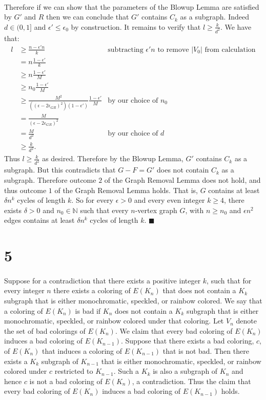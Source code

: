 \documentclass[letterpaper,12pt,oneside,onecolumn]{article}
\newcommand{\N}{\mathbb{N}} \newcommand{\R}{\mathbb{R}}
\begin{document}
\paragraph{}
Therefore if we can show that the parameters of the Blowup Lemma are satisfied by $G'$ and $R$ then we can conclude that $G'$ contains $C_k$ as a subgraph. Indeed $d \in (0,1]$ and $\epsilon' \leq \epsilon_0$ by construction. It remains to verify that $l \geq \frac{k}{d^2}$. We have that:
\begin{align*}
l &\geq \frac{n-\epsilon'n}{k} &\text{subtracting $\epsilon'n$ to remove $|V_0|$ from calculation}\\
&= n\frac{1-\epsilon'}{k} \\
&\geq n\frac{1-\epsilon'}{M}\\
&\geq n_0 \frac{1-\epsilon'}{M} \\
&\geq \frac{M^2}{((\epsilon-2\epsilon_{GR})^2)(1-\epsilon')} \frac{1-\epsilon'}{M} &\text{by our choice of $n_0$} \\
&= \frac{M}{(\epsilon-2\epsilon_{GR})^2} \\
&= \frac{M}{d^2} &\text{by our choice of $d$}\\
&\geq \frac{k}{d^2}.
\end{align*}
Thus $l \geq \frac{k}{d^2}$ as desired. Therefore by the Blowup Lemma, $G'$ contains $C_k$ as a subgraph. But this contradicts that $G-F = G'$ does not contain $C_k$ as a subgraph. Therefore outcome $2$ of the Graph Removal Lemma does not hold, and thus outcome $1$ of the Graph Removal Lemma holds. That is, $G$ contains at least $\delta n^k$ cycles of length $k$. So for every $\epsilon > 0$ and every even integer $k \geq 4$, there exists $\delta > 0$ and $n_0 \in \N$ such that every $n$-vertex graph $G$, with $n\geq n_0$ and $\epsilon n^2$ edges contains at least $\delta n^k$ cycles of length $k$. $\blacksquare$
\section*{5}
\paragraph{}
Suppose for a contradiction that there exists a positive integer $k$, such that for every integer $n$ there exists a coloring of $E(K_n)$ that does not contain a $K_k$ subgraph that is either monochromatic, speckled, or rainbow colored. We say that a coloring of $E(K_n)$ is bad if $K_n$ does not contain a $K_k$ subgraph that is either monochromatic, speckled, or rainbow colored under that coloring. Let $V_n$ denote the set of bad colorings of $E(K_n)$. We claim that every bad coloring of $E(K_n)$ induces a bad coloring of $E(K_{n-1})$. Suppose that there exists a bad coloring, $c$, of $E(K_n)$ that induces a coloring of $E(K_{n-1})$ that is not bad. Then there exists a $K_k$ subgraph of $K_{n-1}$ that is either monochromatic, speckled, or rainbow colored under $c$ restricted to $K_{n-1}$. Such a $K_k$ is also a subgraph of $K_n$ and hence $c$ is not a bad coloring of $E(K_n)$, a contradiction. Thus the claim that every bad coloring of $E(K_n)$ induces a bad coloring of $E(K_{n-1})$ holds.
\end{document}
